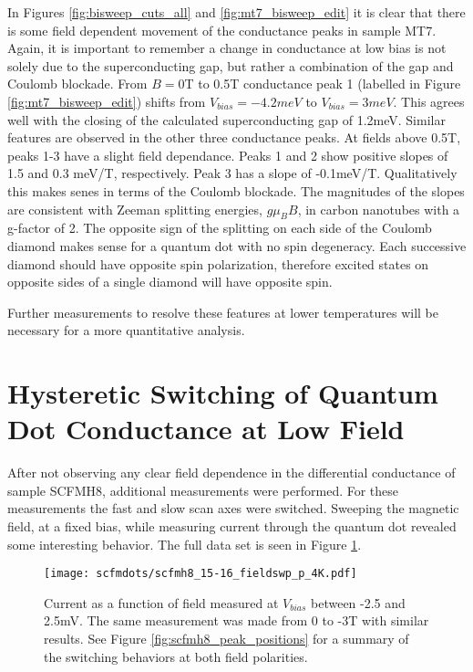 In Figures \ref{fig:bisweep_cuts_all} and \ref{fig:mt7_bisweep_edit} it is clear that there is some field dependent movement of the conductance peaks in sample MT7. Again, it is important to remember a change in conductance at low bias is not solely due to the superconducting gap, but rather a combination of the gap and Coulomb blockade. From $B=0$T to 0.5T conductance peak 1 (labelled in Figure \ref{fig:mt7_bisweep_edit}) shifts from $V_{bias}=-4.2meV$ to $V_{bias}=3meV$. This agrees well with the closing of the calculated superconducting gap of 1.2meV. Similar features are observed in the other three conductance peaks. At fields above 0.5T, peaks 1-3 have a slight field dependance. Peaks 1 and 2 show positive slopes of 1.5 and 0.3 meV/T, respectively. Peak 3 has a slope of -0.1meV/T. Qualitatively this makes senes in terms of the Coulomb blockade. The magnitudes of the slopes are consistent with Zeeman splitting energies, $g \mu_B B$, in carbon nanotubes with a g-factor of 2. The opposite sign of the splitting on each side of the Coulomb diamond makes sense for a quantum dot with no spin degeneracy. Each successive diamond should have opposite spin polarization, therefore excited states on opposite sides of a single diamond will have opposite spin. 

Further measurements to resolve these features at lower temperatures will be necessary for a more quantitative analysis.

\section{Hysteretic Switching of Quantum Dot Conductance at Low Field}
\label{sec:scfm_switching}

After not observing any clear field dependence in the differential conductance of sample SCFMH8, additional measurements were performed. For these measurements the fast and slow scan axes were switched. Sweeping the magnetic field, at a fixed bias, while measuring current through the quantum dot revealed some interesting behavior. The full data set is seen in Figure \ref{fig:scfmh8_positive_field_switching}.

\begin{figure}
    \centering
    \texttt{[image: scfmdots/scfmh8\_15-16\_fieldswp\_p\_4K.pdf]}
    \caption{Current as a function of field measured at $V_{bias}$ between -2.5 and 2.5mV. The same measurement was made from 0 to -3T with similar results. See Figure \ref{fig:scfmh8_peak_positions} for a summary of the switching behaviors at both field polarities.}
    \label{fig:scfmh8_positive_field_switching}
\end{figure}

